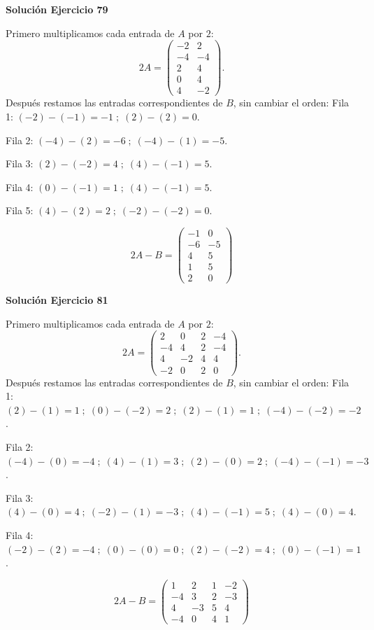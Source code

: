 \documentclass[12pt]{article}
\theoremstyle{remark}
\begin{document}
\par\bigskip\noindent\textbf{Solución Ejercicio 79}\par\nobreak
Primero multiplicamos cada entrada de $A$ por $2$:
\[
2A=\begin{pmatrix}-2&2\\-4&-4\\2&4\\0&4\\4&-2\end{pmatrix}.
\]
Después restamos las entradas correspondientes de $B$, sin cambiar el orden:
Fila 1: $(-2)-(-1)=-1\; ;\; (2)-(2)=0$.

Fila 2: $(-4)-(2)=-6\; ;\; (-4)-(1)=-5$.

Fila 3: $(2)-(-2)=4\; ;\; (4)-(-1)=5$.

Fila 4: $(0)-(-1)=1\; ;\; (4)-(-1)=5$.

Fila 5: $(4)-(2)=2\; ;\; (-2)-(-2)=0$.

\[
\boxed{2A-B=\begin{pmatrix}-1&0\\-6&-5\\4&5\\1&5\\2&0\end{pmatrix}}
\]

\par\bigskip\noindent\textbf{Solución Ejercicio 81}\par\nobreak
Primero multiplicamos cada entrada de $A$ por $2$:
\[
2A=\begin{pmatrix}2&0&2&-4\\-4&4&2&-4\\4&-2&4&4\\-2&0&2&0\end{pmatrix}.
\]
Después restamos las entradas correspondientes de $B$, sin cambiar el orden:
Fila 1: $(2)-(1)=1\; ;\; (0)-(-2)=2\; ;\; (2)-(1)=1\; ;\; (-4)-(-2)=-2$.

Fila 2: $(-4)-(0)=-4\; ;\; (4)-(1)=3\; ;\; (2)-(0)=2\; ;\; (-4)-(-1)=-3$.

Fila 3: $(4)-(0)=4\; ;\; (-2)-(1)=-3\; ;\; (4)-(-1)=5\; ;\; (4)-(0)=4$.

Fila 4: $(-2)-(2)=-4\; ;\; (0)-(0)=0\; ;\; (2)-(-2)=4\; ;\; (0)-(-1)=1$.

\[
\boxed{2A-B=\begin{pmatrix}1&2&1&-2\\-4&3&2&-3\\4&-3&5&4\\-4&0&4&1\end{pmatrix}}
\]
\end{document}
